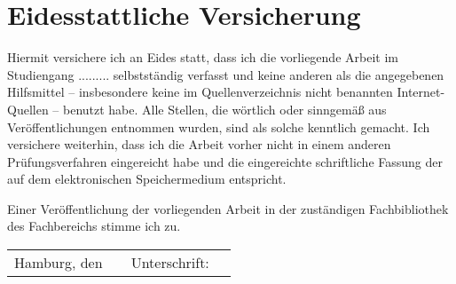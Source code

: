

\chapter*{Eidesstattliche Versicherung}

Hiermit versichere ich an Eides statt, dass ich die vorliegende Arbeit im Studiengang ......... selbstständig verfasst und keine anderen als die angegebenen Hilfsmittel – insbesondere keine im Quellenverzeichnis nicht benannten Internet-Quellen – benutzt habe. Alle Stellen, die wörtlich oder sinngemäß aus Veröffentlichungen entnommen wurden, sind als solche kenntlich gemacht. Ich versichere weiterhin, dass ich die Arbeit vorher nicht in einem anderen Prüfungsverfahren eingereicht habe und die eingereichte schriftliche Fassung der auf dem elektronischen Speichermedium entspricht.\newline

\noindent
Einer Veröffentlichung der vorliegenden Arbeit in der zuständigen Fachbibliothek des Fachbereichs stimme ich zu.\newline


\vspace{25mm}

\noindent
\begin{tabular}{@{}p{2.5cm}p{3cm}p{2cm}p{7cm}}
Hamburg, den  & \hrulefill & Unterschrift: & \hrulefill \\
\end{tabular}


  



\begin{comment}
    Bei der Abgabe der Abschlussarbeit ist eine Versicherung an Eides statt (lt. § 59 Abs. 3 HmbHG) abzugeben:

„Hiermit versichere ich an Eides statt, dass ich die vorliegende Arbeit im Studiengang ...*) selbstständig verfasst und keine anderen als die angegebenen Hilfsmittel – insbesondere keine im Quellenverzeichnis nicht benannten Internet-Quellen – benutzt habe. Alle Stellen, die wörtlich oder sinngemäß aus Veröffentlichungen entnommen wurden, sind als solche kenntlich gemacht. Ich versichere weiterhin, dass ich die Arbeit vorher nicht in einem anderen Prüfungsverfahren eingereicht habe und die eingereichte schriftliche Fassung der auf dem elektronischen Speichermedium entspricht.“             *) bitte Ihren Studiengang und Abschluss eintragen

Die Angabe zur Veröffentlichung in der Fachbibliothek können Sie direkt in die Versicherung mit einbeziehen:

"Einer Veröffentlichung der vorliegenden Arbeit in der zuständigen Fachbibliothek des Fachbereichs stimme ich zu/stimme ich nicht zu."

Bitte drucken Sie diese Versicherung in jedem Exemplar am Ende ab und unterschreiben Sie diese mit der Angabe von Ort und Datum.
\end{comment}




